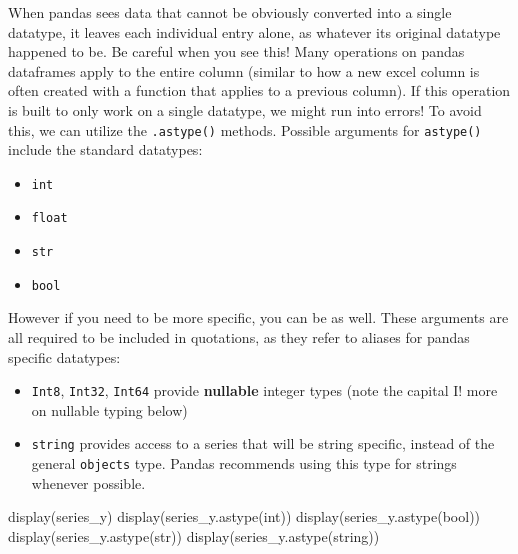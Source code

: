 \documentclass[
  letterpaper,
  DIV=11,
  numbers=noendperiod]{scrreprt}
\newenvironment{Shaded}{\begin{snugshade}}{\end{snugshade}}
\newcommand{\BuiltInTok}[1]{\textcolor[rgb]{0.00,0.23,0.31}{#1}}
\newcommand{\NormalTok}[1]{\textcolor[rgb]{0.00,0.23,0.31}{#1}}
\newcommand{\StringTok}[1]{\textcolor[rgb]{0.13,0.47,0.30}{#1}}
\providecommand{\tightlist}{%
  \setlength{\itemsep}{0pt}\setlength{\parskip}{0pt}}\usepackage{longtable,booktabs,array}
\begin{document}
When pandas sees data that cannot be obviously converted into a single
datatype, it leaves each individual entry alone, as whatever its
original datatype happened to be. Be careful when you see this! Many
operations on pandas dataframes apply to the entire column (similar to
how a new excel column is often created with a function that applies to
a previous column). If this operation is built to only work on a single
datatype, we might run into errors! To avoid this, we can utilize the
\texttt{.astype()} methods. Possible arguments for \texttt{astype()}
include the standard datatypes:

\begin{itemize}
\tightlist
\item
  \texttt{int}
\item
  \texttt{float}
\item
  \texttt{str}
\item
  \texttt{bool}
\end{itemize}

However if you need to be more specific, you can be as well. These
arguments are all required to be included in quotations, as they refer
to aliases for pandas specific datatypes:

\begin{itemize}
\tightlist
\item
  \texttt{\textquotesingle{}Int8\textquotesingle{}},
  \texttt{\textquotesingle{}Int32\textquotesingle{}},
  \texttt{\textquotesingle{}Int64\textquotesingle{}} provide
  \textbf{nullable} integer types (note the capital I! more on nullable
  typing below)
\item
  \texttt{\textquotesingle{}string\textquotesingle{}} provides access to
  a series that will be string specific, instead of the general
  \texttt{objects} type. Pandas recommends using this type for strings
  whenever possible.
\end{itemize}

\begin{Shaded}
\begin{Highlighting}[]
\NormalTok{display(series\_y)}
\NormalTok{display(series\_y.astype(}\BuiltInTok{int}\NormalTok{))}
\NormalTok{display(series\_y.astype(}\BuiltInTok{bool}\NormalTok{))}
\NormalTok{display(series\_y.astype(}\BuiltInTok{str}\NormalTok{))}
\NormalTok{display(series\_y.astype(}\StringTok{\textquotesingle{}string\textquotesingle{}}\NormalTok{))}
\end{Highlighting}
\end{Shaded}
\end{document}
